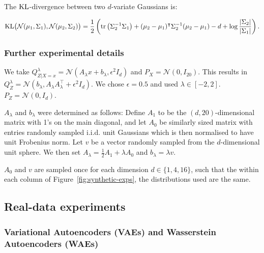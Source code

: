 The $\mathrm{KL}$-divergence between two $d$-variate Gaussians is:
 
\begin{lemma}
\begin{align*}
\mathrm{KL}\bigl( \mathcal{N}(\mu_1, \Sigma_1), 
\mathcal{N}(\mu_2, \Sigma_2)\bigr) = \frac{1}{2} \left( \text{tr}\left(\Sigma_2^{-1} \Sigma_1\right)
+ (\mu_2  - \mu_1)^\intercal \Sigma_2^{-1}(\mu_2 - \mu_1) - d + \log\frac{|\Sigma_2|}{|\Sigma_1|}
\right).
\end{align*}
\end{lemma}

\subsubsection{Further experimental details}

We take $Q^\lambda_{Z|X=x} = \mathcal{N}\left(A_\lambda x + b_\lambda, \epsilon^2 I_d \right)$ and $P_X = \mathcal{N}\left(0, I_{20} \right)$.
This results in $Q^\lambda_Z = \mathcal{N}\left(b_\lambda,  A_\lambda A_\lambda^\intercal + \epsilon^2 I_d \right)$. We chose $\epsilon=0.5$ and used $\lambda \in [-2,2]$. $P_Z = \mathcal{N}(0, I_d)$.

$A_\lambda$ and $b_\lambda$ were determined as follows:
Define $A_1$ to be the $(d, 20)$-dimensional matrix with 1's on the main diagonal, and let $A_0$ be similarly sized matrix with entries randomly sampled i.i.d.\: unit Gaussians which is then normalised to have unit Frobenius norm. 
Let $v$ be a vector randomly sampled from the $d$-dimensional unit sphere.
We then set
$A_\lambda=\frac{1}{2} A_1 + \lambda A_0$ and $b_\lambda= \lambda v$.

$A_0$ and $v$ are sampled once for each dimension $d{\in}\{1,4,16\}$, such that the within each column of Figure~\ref{fig:synthetic-exps}, the distributions used are the same.







\subsection{Real-data experiments}\label{appendix:real-data-experiments-additional}

\subsubsection{Variational Autoencoders (VAEs) and Wasserstein Autoencoders (WAEs)}\label{appendix:intro-vae-wae}

